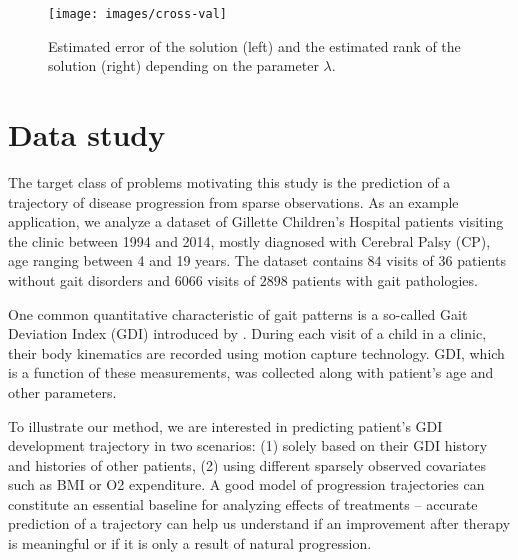 \documentclass[preprint]{imsart}
\numberwithin{equation}{section}
\theoremstyle{plain}
\begin{document}
\begin{figure}[h!]
  \texttt{[image: images/cross-val]}
  \caption{Estimated error of the solution (left) and the estimated rank of the solution (right) depending on the parameter $\lambda$.}
  \label{fig:estimated-rank}
\end{figure}



\section{Data study}

The target class of problems motivating this study is the prediction of a trajectory of disease progression from sparse observations. As an example application, we analyze a dataset of Gillette Children's Hospital patients visiting the clinic between 1994 and 2014, mostly diagnosed with Cerebral Palsy (CP), age ranging between 4 and 19 years. The dataset contains $84$ visits of $36$ patients without gait disorders and $6066$ visits of $2898$ patients with gait pathologies. 

One common quantitative characteristic of gait patterns is a so-called Gait Deviation Index (GDI) introduced by \citet{schwartz2008gait}. During each visit of a child in a clinic, their body kinematics are recorded using motion capture technology. GDI, which is a function of these measurements, was collected along with patient's age and other parameters.

To illustrate our method, we are interested in predicting patient's GDI development trajectory in two scenarios: (1) solely based on their GDI history and histories of other patients, (2) using different sparsely observed covariates such as BMI or O2 expenditure. A good model of progression trajectories can constitute an essential baseline for analyzing effects of treatments -- accurate prediction of a trajectory can help us understand if an improvement after therapy is meaningful or if it is only a result of natural progression.
\end{document}
